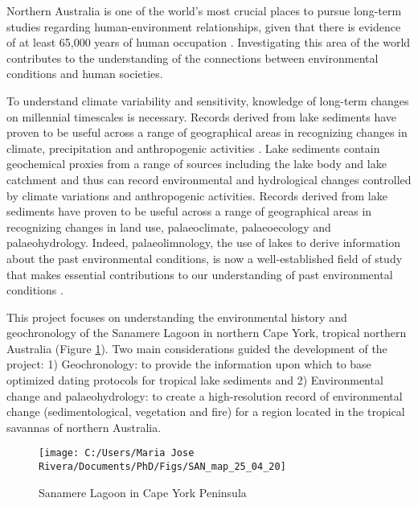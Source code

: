 \documentclass[
  12pt,
]{book}
\begin{document}
Northern Australia is one of the world's most crucial places to pursue long-term studies regarding human-environment relationships, given that there is evidence of at least 65,000 years of human occupation \citep{clarksonHumanOccupationNorthern2017}. Investigating this area of the world contributes to the understanding of the connections between environmental conditions and human societies.

To understand climate variability and sensitivity, knowledge of long-term changes on millennial timescales is necessary. Records derived from lake sediments have proven to be useful across a range of geographical areas in recognizing changes in climate, precipitation and anthropogenic activities \citep{lengPalaeoclimateInterpretationStable2004, meyersLacustrineSedimentaryOrganic1999}. Lake sediments contain geochemical proxies from a range of sources including the lake body and lake catchment and thus can record environmental and hydrological changes controlled by climate variations and anthropogenic activities. Records derived from lake sediments have proven to be useful across a range of geographical areas in recognizing changes in land use, palaeoclimate, palaeoecology and palaeohydrology. Indeed, palaeolimnology, the use of lakes to derive information about the past environmental conditions, is now a well-established field of study that makes essential contributions to our understanding of past environmental conditions \citep{cohenPaleolimnologyHistoryEvolution2003, catalanGlobalChangeRevealed2013}.

This project focuses on understanding the environmental history and geochronology of the Sanamere Lagoon in northern Cape York, tropical northern Australia (Figure \ref{fig:fig-CP}). Two main considerations guided the development of the project: 1) Geochronology: to provide the information upon which to base optimized dating protocols for tropical lake sediments and 2) Environmental change and palaeohydrology: to create a high-resolution record of environmental change (sedimentological, vegetation and fire) for a region located in the tropical savannas of northern Australia.

\begin{figure}

{\centering \texttt{[image: C:/Users/Maria Jose Rivera/Documents/PhD/Figs/SAN\_map\_25\_04\_20]} 

}

\caption{Sanamere Lagoon in Cape York Peninsula}\label{fig:fig-CP}
\end{figure}
\end{document}
